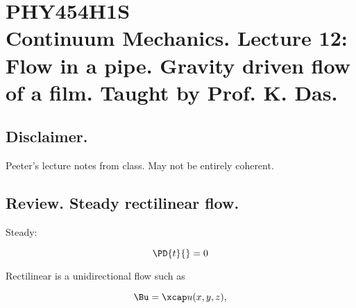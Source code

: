 
%

\chapter{PHY454H1S\\Continuum Mechanics.  Lecture 12: Flow in a pipe.  Gravity driven flow of a film.  Taught by Prof. K. Das.}
\label{chap:continuumL12}
{}
\date{Feb 12, 2012}

\beginArtWithToc

\section{Disclaimer.}

Peeter's lecture notes from class.  May not be entirely coherent.

\section{Review.  Steady rectilinear flow.}

Steady:

\begin{equation}\label{eqn:continuumL12:10}
\PD{t}{} = 0
\end{equation}

Rectilinear is a unidirectional flow such as

\begin{equation}\label{eqn:continuumL12:30}
\Bu = \xcap u( x, y, z ),
\end{equation}

